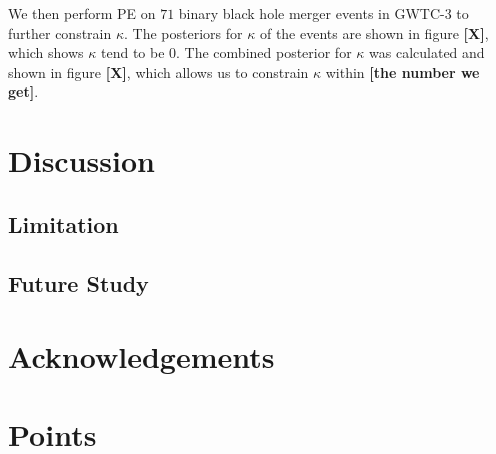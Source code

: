 \documentclass[twocolumn]{aastex631}
\begin{document}
We then perform PE on $71$ binary black hole merger events in GWTC-3 to further constrain $\kappa$.
The posteriors for $\kappa$ of the events are shown in figure \textbf{[X]}, which shows $\kappa$ tend to be $0$.
The combined posterior for $\kappa$ was calculated and shown in figure \textbf{[X]}, which allows us to constrain $\kappa$ within \textbf{[the number we get]}.

\section{Discussion}

\subsection{Limitation}



\subsection{Future Study}



\section{Acknowledgements}





\section{Points}
\end{document}
